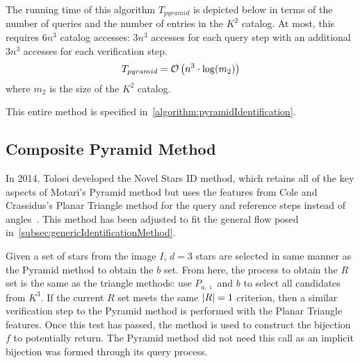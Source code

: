 \begin{algorithm}[ht]
\end{algorithm}

The running time of this algorithm $T_{pyramid}$ is depicted below in terms of the number of queries and the number
of entries in the $K^2$ catalog.
At most, this requires $6n^3$ catalog accesses: $3n^3$ accesses for each query step with an additional $3n^3$ accesses
for each verification step.
\begin{equation}
    T_{pyramid} = \mathcal{O} \left( n^3 \cdot \log( m_2 ) \right)
\end{equation}
where $m_2$ is the size of the $K^2$ catalog.

This entire method is specified in~\autoref{algorithm:pyramidIdentification}.

\subsection{Composite Pyramid Method}\label{subsec:compositePyramidMethod}
In 2014, Toloei developed the Novel Stars ID method, which retains all of the key aspects of Motari's
Pyramid method but uses the features from Cole and Crassidus's Planar Triangle method for the query and reference steps
instead of angles~\cite{Composite}.
This method has been adjusted to fit the general flow posed in~\autoref{subsec:genericIdentificationMethod}.

Given a set of stars from the image $I$, $d = 3$ stars are selected in same manner as the Pyramid method to obtain
the $b$ set.
From here, the process to obtain the $R$ set is the same as the triangle methods: use $P_{a, \imath}$ and $b$ to select
all candidates from $K^3$.
If the current $R$ set meets the same $\left| R \right| = 1$ criterion, then a similar verification step to the Pyramid method
is performed with the Planar Triangle features.
Once this test has passed, the  method is used to construct the bijection $f$ to potentially return.
The Pyramid method did not need this call as an implicit bijection was formed through its query process.

